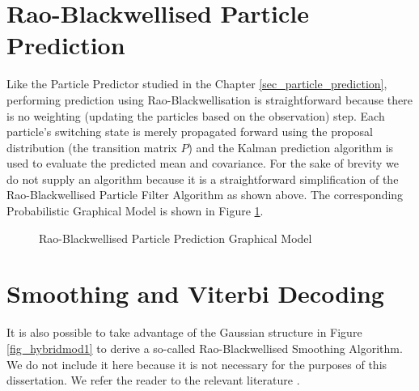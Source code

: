 \section{Rao-Blackwellised Particle Prediction}
\label{sec_inf_rbpf_pred}
Like the Particle Predictor studied in the Chapter \ref{sec_particle_prediction}, performing prediction using Rao-Blackwellisation is straightforward because there is no weighting (updating the particles based on the observation) step. Each particle's switching state is merely propagated forward using the proposal distribution (the transition matrix $P$) and the Kalman prediction algorithm is used to evaluate the predicted mean and covariance. For the sake of brevity we do not supply an algorithm because it is a straightforward simplification of the Rao-Blackwellised Particle Filter Algorithm as shown above. The corresponding Probabilistic Graphical Model is shown in Figure \ref{fig_hybridmod1_prediction}.
\begin{figure}[H] 
\centering
{}
\caption{Rao-Blackwellised Particle Prediction Graphical Model}
\label{fig_hybridmod1_prediction}
\end{figure}

\section{Smoothing and Viterbi Decoding}
It is also possible to take advantage of the Gaussian structure in Figure \ref{fig_hybridmod1} to derive a so-called Rao-Blackwellised Smoothing Algorithm. We do not include it here because it is not necessary for the purposes of this dissertation. We refer the reader to the relevant literature \cite{chen}\cite{doucet}. 

